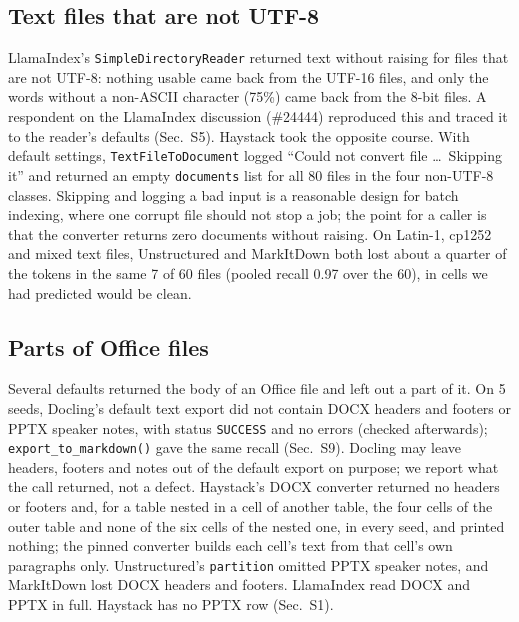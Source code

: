 \documentclass[aps,pre,twocolumn,superscriptaddress,nofootinbib,10pt]{revtex4-2}
\begin{document}
\subsection{Text files that are not UTF-8}
LlamaIndex's \texttt{SimpleDirectoryReader} returned text without raising for files that are not UTF-8: nothing usable came back from the UTF-16 files, and only the words without a non-ASCII character (75\%) came back from the 8-bit files. A respondent on the LlamaIndex discussion (\#24444) reproduced this and traced it to the reader's defaults (Sec.~S5). Haystack took the opposite course. With default settings, \texttt{TextFileToDocument} logged ``Could not convert file \ldots\ Skipping it'' and returned an empty \texttt{documents} list for all 80 files in the four non-UTF-8 classes. Skipping and logging a bad input is a reasonable design for batch indexing, where one corrupt file should not stop a job; the point for a caller is that the converter returns zero documents without raising. On Latin-1, cp1252 and mixed text files, Unstructured and MarkItDown both lost about a quarter of the tokens in the same 7 of 60 files (pooled recall 0.97 over the 60), in cells we had predicted would be clean.

\subsection{Parts of Office files}
Several defaults returned the body of an Office file and left out a part of it. On 5 seeds, Docling's default text export did not contain DOCX headers and footers or PPTX speaker notes, with status \texttt{SUCCESS} and no errors (checked afterwards); \texttt{export\_to\_markdown()} gave the same recall (Sec.~S9). Docling may leave headers, footers and notes out of the default export on purpose; we report what the call returned, not a defect. Haystack's DOCX converter returned no headers or footers and, for a table nested in a cell of another table, the four cells of the outer table and none of the six cells of the nested one, in every seed, and printed nothing; the pinned converter builds each cell's text from that cell's own paragraphs only. Unstructured's \texttt{partition} omitted PPTX speaker notes, and MarkItDown lost DOCX headers and footers. LlamaIndex read DOCX and PPTX in full. Haystack has no PPTX row (Sec.~S1).
\end{document}
